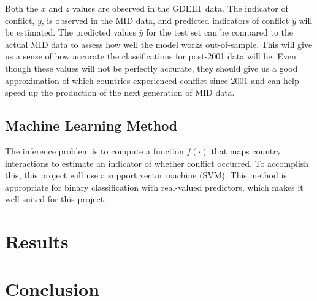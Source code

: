 \documentclass[12pt,letterpaper]{article}
\begin{document}

Both the $x$ and $z$ values are observed in the GDELT data. The indicator of conflict, $y$, is observed in the MID data, and predicted indicators of conflict $\hat{y}$ will be estimated. The predicted values $\hat{y}$ for the test set can be compared to the actual MID data to assess how well the model works out-of-sample. This will give us a sense of how accurate the classifications for post-2001 data will be. Even though these values will not be perfectly accurate, they should give us a good approximation of which countries experienced conflict since 2001 and can help speed up the production of the next generation of MID data. 

\subsection{Machine Learning Method}


The inference problem is to compute a function $f(\cdot)$ that maps country interactions to estimate an indicator of whether conflict occurred. To accomplish this, this project will use a support vector machine (SVM). This method is appropriate for binary classification with real-valued predictors, which makes it well suited for this project.

\section{Results}
\label{results}


\section{Conclusion}
\label{conclusion}






\pagebreak
\singlespacing
\setlength{\bibsep}{0.0pt}


\end{document}
